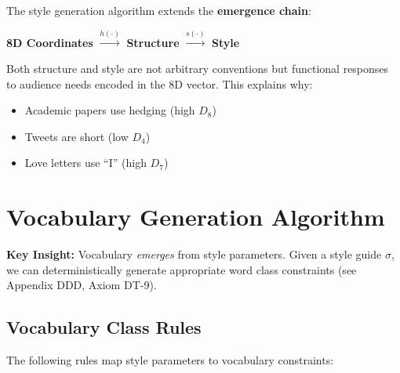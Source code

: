\begin{tcolorbox}[colback=yellow!5!white, colframe=yellow!75!black,
    title=Key Insight: Emergent Style]

The style generation algorithm extends the \textbf{emergence chain}:

\begin{center}
\textbf{8D Coordinates} $\xrightarrow{h(\cdot)}$ \textbf{Structure} $\xrightarrow{s(\cdot)}$ \textbf{Style}
\end{center}

Both structure and style are not arbitrary conventions but functional responses
to audience needs encoded in the 8D vector. This explains why:
\begin{itemize}[nosep]
\item Academic papers use hedging (high $D_8$)
\item Tweets are short (low $D_4$)
\item Love letters use ``I'' (high $D_7$)
\end{itemize}

\end{tcolorbox}


\section{Vocabulary Generation Algorithm}
\label{sec:doctype-vocabulary}

\textbf{Key Insight:} Vocabulary \textit{emerges} from style parameters.
Given a style guide $\sigma$, we can deterministically generate appropriate
word class constraints (see Appendix DDD, Axiom DT-9).

\subsection{Vocabulary Class Rules}

The following rules map style parameters to vocabulary constraints:

